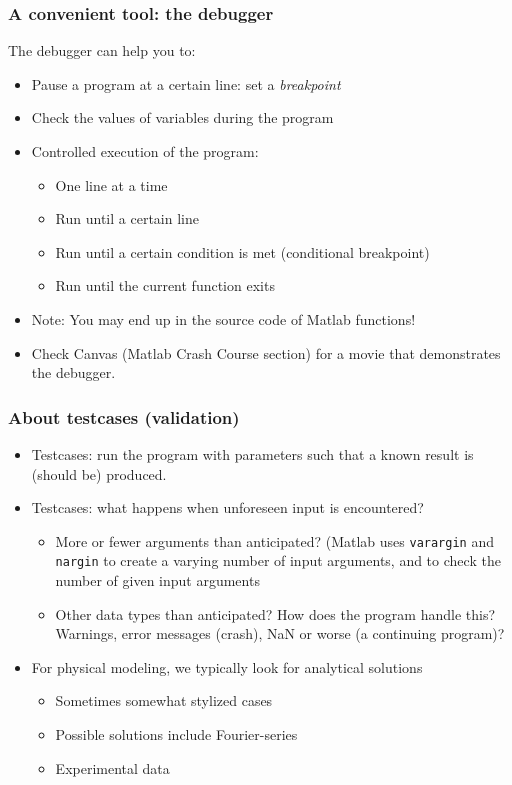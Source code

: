 \begin{frame}
\frametitle{A convenient tool: the debugger}
The debugger can help you to:
\begin{itemize}
  \item Pause a program at a certain line: set a \emph{breakpoint}
  \item Check the values of variables during the program
  \item Controlled execution of the program:
  \begin{itemize}
    \item One line at a time
    \item Run until a certain line
    \item Run until a certain condition is met (conditional breakpoint)
    \item Run until the current function exits
  \end{itemize}
  \item Note: You may end up in the source code of Matlab functions!\pause
  \item Check Canvas (Matlab Crash Course section) for a movie that demonstrates the debugger.
\end{itemize}
\end{frame}
% 
\begin{frame}
  \frametitle{About testcases (validation)}
  \begin{itemize}
    \item Testcases: run the program with parameters such that a known result is (should be) produced.
    \item Testcases: what happens when unforeseen input is encountered?
    \begin{itemize}
      \item More or fewer arguments than anticipated? (Matlab uses \lstinline$varargin$ and \lstinline$nargin$ to create a varying number of input arguments, and to check the number of given input arguments
      \item Other data types than anticipated? How does the program handle this? Warnings, error messages (crash), NaN or worse (a continuing program)?
    \end{itemize}
    \item For physical modeling, we typically look for analytical solutions
    \begin{itemize}
      \item Sometimes somewhat stylized cases
      \item Possible solutions include Fourier-series
      \item Experimental data
    \end{itemize}

  \end{itemize}
\end{frame}
% 
